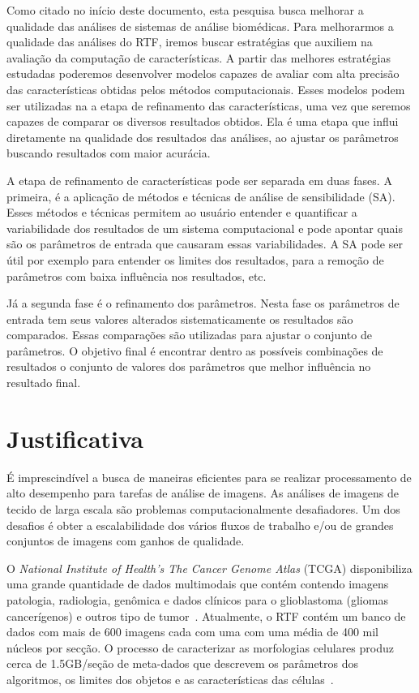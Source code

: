 \documentclass[a4paper,10pt]{article}
\begin{document}
Como citado no início deste documento, esta pesquisa busca melhorar a qualidade das análises de sistemas de análise biomédicas. Para melhorarmos a qualidade das análises do RTF, iremos buscar estratégias que auxiliem na avaliação da computação de características. A partir das melhores estratégias estudadas poderemos desenvolver modelos capazes de avaliar com alta precisão das características obtidas pelos métodos computacionais. Esses modelos podem ser utilizadas na a etapa de refinamento das características, uma vez que seremos capazes de comparar os diversos resultados obtidos. Ela é uma etapa que influi diretamente na qualidade dos resultados das análises, ao ajustar os parâmetros buscando resultados com maior acurácia.

A etapa de refinamento de características pode ser separada em duas fases. A primeira, é a aplicação de métodos e técnicas de análise de sensibilidade (SA). Esses métodos e técnicas permitem ao usuário entender e quantificar a variabilidade dos resultados de um sistema computacional e pode apontar quais são os parâmetros de entrada que causaram essas variabilidades. A SA pode ser útil por exemplo para entender os limites dos resultados, para a remoção de parâmetros com baixa influência nos resultados, etc.

Já a segunda fase é o refinamento dos parâmetros. Nesta fase os parâmetros de entrada tem seus valores alterados sistematicamente os resultados são comparados. Essas comparações são utilizadas para ajustar o conjunto de parâmetros. O objetivo final é encontrar dentro as possíveis combinações de resultados o conjunto de valores dos parâmetros que melhor influência no resultado final.


\section{Justificativa}

É imprescindível a busca de maneiras eficientes para se realizar processamento de alto desempenho para tarefas de análise de imagens. As análises de imagens de tecido de larga escala são problemas computacionalmente desafiadores. Um dos desafios é obter a escalabilidade dos vários fluxos de trabalho e/ou de grandes conjuntos de imagens com ganhos de qualidade. 

O \textit{National Institute of Health’s The Cancer Genome Atlas} (TCGA) disponibiliza uma grande quantidade de dados multimodais que contém contendo imagens patologia, radiologia, genômica e dados clínicos para o glioblastoma (gliomas cancerígenos) e outros tipo de tumor~\cite{mclendon2008comprehensive}. Atualmente, o RTF contém um banco de dados com mais de 600 imagens cada com uma com uma média de 400 mil núcleos por secção. O processo de caracterizar as morfologias celulares produz cerca de 1.5GB/seção de meta-dados que descrevem os parâmetros dos algoritmos, os limites dos objetos e as características das células~\cite{cooper2011morphological}.
\end{document}
